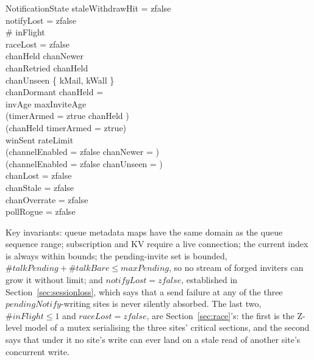 \documentclass[a4paper,10pt,fleqn]{article}
\begin{document}
\begin{schema}{NotificationState}
  staleWithdrawHit = zfalse \\
  notifyLost = zfalse \\
  \# inFlight  \\
  raceLost = zfalse \\
  chanHeld \subseteq chanNewer \\
  chanRetried \subseteq chanHeld \\
  chanUnseen \subseteq \{ kMail, kWall \} \\
  chanDormant \cap chanHeld = \emptyset \\
  invAge \leq maxInviteAge \\
  (timerArmed = ztrue \implies chanHeld \neq \emptyset) \\
  (chanHeld \neq \emptyset \implies timerArmed = ztrue) \\
  winSent \leq rateLimit \\
  (channelEnabled = zfalse \implies chanNewer = \emptyset) \\
  (channelEnabled = zfalse \implies chanUnseen = \emptyset) \\
  chanLost = zfalse \\
  chanStale = zfalse \\
  chanOverrate = zfalse \\
  pollRogue = zfalse
\end{schema}

Key invariants: queue metadata maps have the same domain as the
queue sequence range; subscription and KV require a live connection;
the current index is always within bounds; the pending-invite set is
bounded, $\# talkPending + \# talkBare \leq maxPending$, so no stream
of forged inviters can grow it without limit; and $notifyLost = zfalse$,
established in Section~\ref{sec:sessionloss}, which says that a send
failure at any of the three $pendingNotify$-writing sites is never
silently absorbed.  The last two, $\# inFlight \leq 1$ and $raceLost =
zfalse$, are Section~\ref{sec:race}'s: the first is the Z-level model of
a mutex serialising the three sites' critical sections, and the second
says that under it no site's write can ever land on a stale read of
another site's concurrent write.
\end{document}
